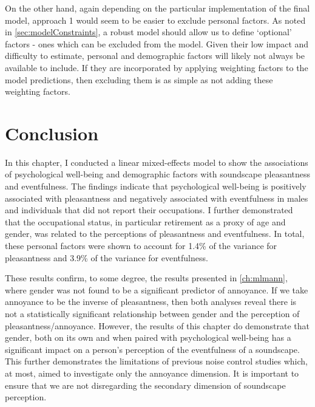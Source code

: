 On the other hand, again depending on the particular implementation of the final model, approach 1 would seem to be easier to exclude personal factors. As noted in \cref{sec:modelConstraints}, a robust model should allow us to define `optional' factors - ones which can be excluded from the model. Given their low impact and difficulty to estimate, personal and demographic factors will likely not always be available to include. If they are incorporated by applying weighting factors to the model predictions, then excluding them is as simple as not adding these weighting factors. 

\section{Conclusion}
In this chapter, I conducted a linear mixed-effects model to show the associations of psychological well-being and demographic factors with soundscape pleasantness and eventfulness. The findings indicate that psychological well-being is positively associated with pleasantness and negatively associated with eventfulness in males and individuals that did not report their occupations. I further demonstrated that the occupational status, in particular retirement as a proxy of age and gender, was related to the perceptions of pleasantness and eventfulness. In total, these personal factors were shown to account for 1.4\% of the variance for pleasantness and 3.9\% of the variance for eventfulness. 

These results confirm, to some degree, the results presented in \cref{ch:mlmann}, where gender was not found to be a significant predictor of annoyance. If we take annoyance to be the inverse of pleasantness, then both analyses reveal there is not a statistically significant relationship between gender and the perception of pleasantness/annoyance. However, the results of this chapter do demonstrate that gender, both on its own and when paired with psychological well-being has a significant impact on a person's perception of the eventfulness of a soundscape. This further demonstrates the limitations of previous noise control studies which, at most, aimed to investigate only the annoyance dimension. It is important to ensure that we are not disregarding the secondary dimension of soundscape perception. 

